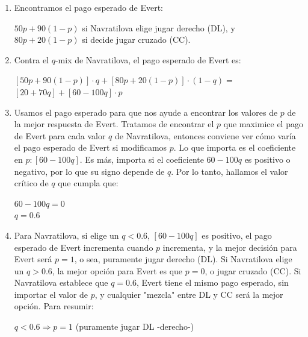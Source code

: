 \documentclass{article}
\begin{document}
        \newpage
        
        \begin{enumerate}
            \item Encontramos el pago esperado de Evert:
                \begin{center}
                    $50p+90(1-p)$ si Navratilova elige jugar derecho (DL), y
                    \\
                    $80p+20(1-p)$ si decide jugar cruzado (CC).
                \end{center}
            \item Contra el $q$-mix de Navratilova, el pago esperado de Evert es:
                \begin{center}
                    $[50p+90(1-p)] \cdot q + [80p+20(1-p)] \cdot (1-q) = $
                    \\
                    $[20+70q] + [60-100q] \cdot p$
                \end{center}
            \item Usamos el pago esperado para que nos ayude a encontrar los valores de $p$ de la mejor respuesta de Evert. Tratamos de encontrar el $p$ que maximice el pago de Evert para cada valor $q$ de Navratilova, entonces conviene ver cómo varía el pago esperado de Evert si modificamos $p$. Lo que importa es el coeficiente en $p: [60-100q]$. Es más, importa si el coeficiente $60-100q$ es positivo o negativo, por lo que su signo depende de $q$. Por lo tanto, hallamos el valor crítico de $q$ que cumpla que:
                \begin{center}
                    $60-100q = 0$
                    \\
                    $q = 0.6$
                \end{center}
            \item Para Navratilova, si elige un $q < 0.6$, $[60-100q]$ es positivo, el pago esperado de Evert incrementa cuando $p$ incrementa, y la mejor decisión para Evert será $p = 1$, o sea, puramente jugar derecho (DL). Si Navratilova elige un $q > 0.6$, la mejor opción para Evert es que $p = 0$, o jugar cruzado (CC). Si Navratilova establece que $q=0.6$, Evert tiene el mismo pago esperado, sin importar el valor de $p$, y cualquier "mezcla" entre DL y CC será la mejor opción. Para resumir:
                \begin{center}
                    $q < 0.6 \Rightarrow p = 1$ (puramente jugar DL -derecho-)
                    \\

\end{center}
\end{enumerate}
\end{document}
